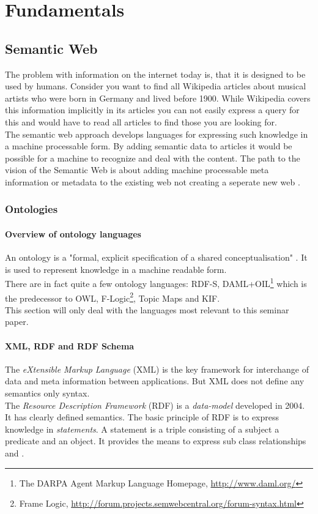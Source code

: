 \chapter{Fundamentals}

\section{Semantic Web}
The problem with information on the internet today is, that it is designed
to be used by humans. Consider you want to find all Wikipedia articles
about musical artists who were born in Germany and lived before 1900.
While Wikipedia covers this information
implicitly in its articles you can not easily express a query for this and
would have to read all articles to find those you are looking for.\\
The semantic web approach develops languages for expressing such knowledge
in a machine processable form.
By adding semantic data to articles it would be possible for a machine
to recognize and deal with the content. The path to the vision of the
Semantic Web is about adding machine processable meta information or
metadata to the existing web not creating a seperate new web \cite{berners-lee98}.


\subsection{Ontologies}
\subsubsection{Overview of ontology languages}
An ontology is a "formal, explicit specification of a shared conceptualisation"
\cite{gruber1993}. It is used to represent knowledge in a machine readable form.
\\
There are in fact quite a few ontology languages:
RDF-S, DAML+OIL\footnote{The DARPA Agent Markup Language Homepage, \url{http://www.daml.org/}}
which is the predecessor to OWL, F-Logic\footnote{Frame Logic, \url{http://forum.projects.semwebcentral.org/forum-syntax.html}}, Topic Maps and KIF.\\
This section will only deal with the languages most relevant to this
seminar paper.


\subsubsection{XML, RDF and RDF Schema}
The \emph{eXtensible Markup Language} (XML) is the key framework for interchange
of data and meta information between applications. But XML does not define
any semantics only syntax.\\
The \emph{Resource Description Framework} (RDF) is a \emph{data-model}
developed in 2004.
It has clearly defined semantics. The basic principle of RDF is to
express knowledge in \emph{statements}. A statement is a triple consisting
of a subject a predicate and an object.
It provides the means to express sub class relationships and .

